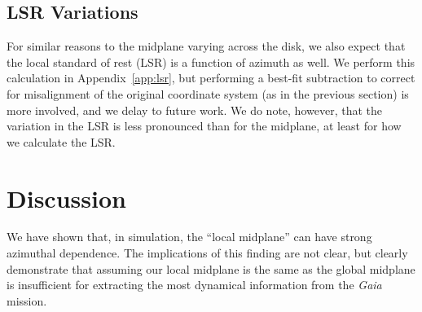 \documentclass[twocolumn]{aastex62}
\newcommand{\Gus}[1]{\textcolor{red}{#1}}
\newcommand{\kpc}{\text{kpc}}
\newcommand{\uth}{\textsuperscript{th}}
\begin{document}
\begin{figure*}
\caption{The local midplane determined at the fiducial Solar radius
($8.2\,\kpc$) for the three FIRE galaxies m12i, m21f, and m12m ({\em left},
{\em center}, and {\em right} panels). The local midplane is determined at a
position $\phi$ by taking the median height of all stars within $R=0.5\,\kpc$
and $z=1\,\kpc$ (in cylindrical coordinates). The procedure is performed again
using the new height $10$ times to converge on the local midplane height. In
order to allow for the possibility that the fiducial Galactocentric coordinate
system is incorrect, we subtract the best fit $A\sin{(\phi+B)}+C$ curve from
each panel --- this figure is reproduced with the original midplane
determination (i.e. before subtracting the best fit sine curve) in
Appendix~\Gus{x}. We then bootstrap resample $1000$ times on all stars within
a $2\,\kpc$ height of the fiducial midplane to determine error bars (95\uth
and 5\uth percentiles), which we report as dashed lines.}
\label{fig:midplane}
\end{figure*}

\subsection{LSR Variations} \label{ssec:lsr_var}
For similar reasons to the midplane varying across the disk, we also expect
that the local standard of rest (LSR) is a function of azimuth as well. We
perform this calculation in Appendix~\ref{app:lsr}, but performing a
best-fit subtraction to correct for misalignment of the original coordinate system (as in the previous section) is more involved, and we
delay to future work. We do note, however, that the variation in the LSR is
less pronounced than for the midplane, at least for how we calculate the LSR.

\section{Discussion} \label{sec:discussion}
We have shown that, in simulation, the ``local midplane'' can have strong
azimuthal dependence. The implications of this finding are not clear, but
clearly demonstrate that assuming our local midplane is the same as the global
midplane is insufficient for extracting the most dynamical information from
the {\em Gaia} mission.
\end{document}

